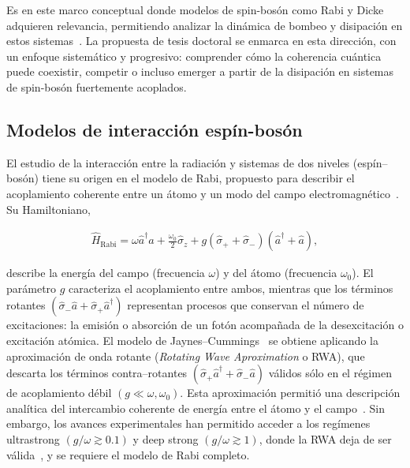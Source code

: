 \documentclass[onecolumn,notitlepage,letterpaper,aps,pra,12pt]{article}
\numberwithin{equation}{section}
\begin{document}
Es en este marco conceptual donde modelos de spin-bosón como Rabi y Dicke adquieren relevancia, permitiendo analizar la dinámica de bombeo y disipación en estos sistemas~\cite{hwang2018,DiBello2024-2,Nagy10,Klinder15}. La propuesta de tesis doctoral se enmarca en esta dirección, con un enfoque sistemático y progresivo: comprender cómo la coherencia cuántica puede coexistir, competir o incluso emerger a partir de la disipación en sistemas de spin-bosón fuertemente acoplados. 

\subsection{Modelos de interacción espín-bosón}

El estudio de la interacción entre la radiación y sistemas de dos niveles (espín–bosón) tiene su origen en el modelo de Rabi, propuesto para describir el acoplamiento coherente entre un átomo y un modo del campo electromagnético~\cite{rabi1936}. Su Hamiltoniano,

\begin{gather}\label{Hamiltoniano de Rabi}
    \hat{H}_{\text{Rabi}} = \omega\hat{a}^{\dagger}\hat{a} + \frac{\omega_{0}}{2}\hat{\sigma}_{z} + g\left( \hat{\sigma}_{+} + \hat{\sigma}_{-} \right)\left( \hat{a}^{\dagger} + \hat{a} \right),
\end{gather}

describe la energía del campo (frecuencia $\omega$) y del átomo (frecuencia $\omega_{0}$). El parámetro $g$ caracteriza el acoplamiento entre ambos, mientras que los términos rotantes $(\hat{\sigma}_{-}\hat{a} + \hat{\sigma}_{+}\hat{a}^{\dagger})$ representan procesos que conservan el número de excitaciones: la emisión o absorción de un fotón acompañada de la desexcitación o excitación atómica. El modelo de Jaynes–Cummings~\cite{Jaynes1963} se obtiene aplicando la aproximación de onda rotante (\textit{Rotating Wave Aproximation} o RWA), que descarta los términos contra–rotantes $(\hat{\sigma}_{+}\hat{a}^{\dagger} + \hat{\sigma}_{-}\hat{a})$ válidos sólo en el régimen de acoplamiento débil $(g \ll \omega,\omega_{0})$. Esta aproximación permitió una descripción analítica del intercambio coherente de energía entre el átomo y el campo~\cite{wallraff2004}. Sin embargo, los avances experimentales han permitido acceder a los regímenes ultrastrong $(g/\omega \gtrsim 0.1)$ y deep strong $(g/\omega \gtrsim 1)$, donde la RWA deja de ser válida~\cite{FornDiaz2019}, y se requiere el modelo de Rabi completo.
\end{document}
